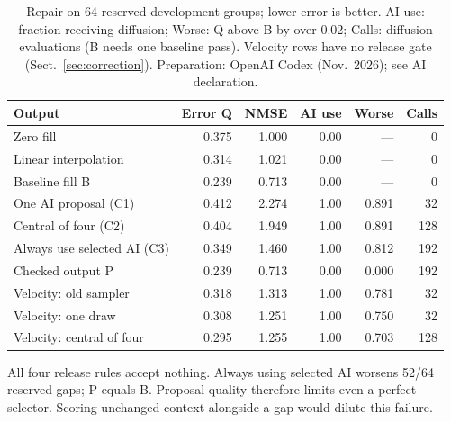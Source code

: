 \documentclass[runningheads,orivec]{llncs}
\begin{document}
\begin{table}[htbp]
\caption{Repair on 64 reserved development groups; lower error is better. AI use: fraction receiving diffusion; Worse: Q above B by over 0.02; Calls: diffusion evaluations (B needs one baseline pass). Velocity rows have no release gate (Sect.~\ref{sec:correction}). Preparation: OpenAI Codex (Nov.\ 2026); see AI declaration.}
\label{tab:2}
\centering\small
\begin{tabular*}{\linewidth}{@{\extracolsep{\fill}}lrrrrr@{}}
\toprule

\textbf{Output} & \textbf{Error Q} & \textbf{NMSE} & \textbf{AI use} & \textbf{Worse} & \textbf{Calls} \\

\midrule

Zero fill & 0.375 & 1.000 & 0.00 & --- & 0 \\

Linear interpolation & 0.314 & 1.021 & 0.00 & --- & 0 \\

Baseline fill B & 0.239 & 0.713 & 0.00 & --- & 0 \\

One AI proposal (C1) & 0.412 & 2.274 & 1.00 & 0.891 & 32 \\

Central of four (C2) & 0.404 & 1.949 & 1.00 & 0.891 & 128 \\

Always use selected AI (C3) & 0.349 & 1.460 & 1.00 & 0.812 & 192 \\

Checked output P & 0.239 & 0.713 & 0.00 & 0.000 & 192 \\

\midrule

Velocity: old sampler & 0.318 & 1.313 & 1.00 & 0.781 & 32 \\

Velocity: one draw & 0.308 & 1.251 & 1.00 & 0.750 & 32 \\

Velocity: central of four & 0.295 & 1.255 & 1.00 & 0.703 & 128 \\

\bottomrule
\end{tabular*}
\end{table}

All four release rules accept nothing. Always using selected AI worsens 52/64 reserved gaps; P equals B. Proposal quality therefore limits even a perfect selector. Scoring unchanged context alongside a gap would dilute this failure.
\end{document}
